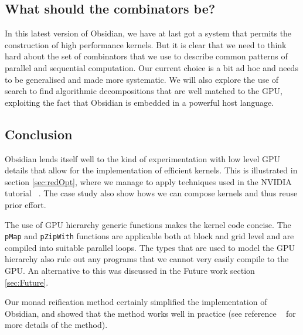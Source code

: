 \subsection{What should the combinators be?}
In this latest version of Obsidian, we have at last got a system
that permits the construction of high performance kernels. But it is
clear that we need to think hard about the set of combinators that
we use to describe common patterns of parallel and sequential computation.
Our current choice is a bit ad hoc and needs to be generalised and made
more systematic. We will also explore the use of search to find algorithmic 
decompositions that are well matched to the GPU, exploiting the fact 
that Obsidian is embedded in a powerful host language.

\subsection{Conclusion}



Obsidian lends itself well to the kind of experimentation with low level 
GPU details that allow for the implementation of efficient kernels. This is 
illustrated in section \ref{sec:redOpt}, where we manage to apply techniques
used in the NVIDIA tutorial ~\cite{reduction}. The case study also show hows we 
can compose kernels and thus reuse prior effort. 

The use of GPU hierarchy generic functions makes the kernel code concise. The 
{\tt pMap} and {\tt pZipWith} functions are applicable both at block and grid 
level and are compiled into suitable parallel loops. The types that are used 
to model the GPU hierarchy also rule out any programs that we cannot 
very easily compile to the GPU. An alternative to this was discussed in 
the Future work section \ref{sec:Future}.


Our monad reification method certainly simplified
the implementation of Obsidian, and showed that the method works
well in practice (see reference ~\cite{BB} for more details of the method).

